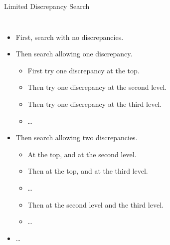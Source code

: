 \documentclass{beamer}
\begin{document}
\begin{frame}{Limited Discrepancy Search}


    \begin{columns}[T]
        \begin{itemize}
            \item First, search with no discrepancies.
            \item Then search allowing one discrepancy.
                \begin{itemize}
                    \item First try one discrepancy at the top.
                    \item Then try one discrepancy at the second level.
                    \item Then try one discrepancy at the third level.
                    \item \ldots
                \end{itemize}
            \item Then search allowing two discrepancies.
                \begin{itemize}
                    \item At the top, and at the second level.
                    \item Then at the top, and at the third level.
                    \item \ldots
                    \item Then at the second level and the third level.
                    \item \ldots
                \end{itemize}
            \item \ldots
        \end{itemize}


\end{columns}
\end{frame}
\end{document}
